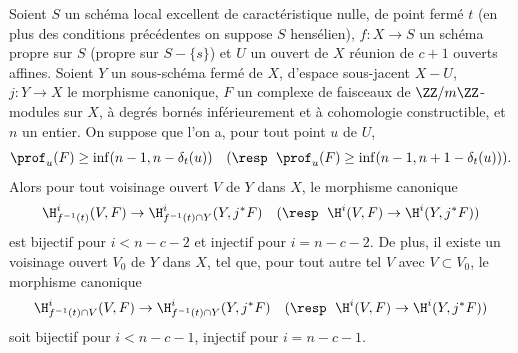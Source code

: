 \begin{proposition} \label{XIV.4.9}
Soient $S$ un sch\'ema local excellent de caract\'eristique nulle, de point ferm\'e $t$ (\resp en plus des conditions pr\'ec\'edentes on suppose $S$ hens\'elien), $f\colon X\to S$ un sch\'ema propre sur $S$ (\resp propre sur $S-\{ s\}$) et $U$ un ouvert de $X$ r\'eunion de $c+1$ ouverts affines. Soient $Y$ un sous-sch\'ema ferm\'e de $X$, d'espace sous-jacent $X-U$, $j\colon Y\to X$ le morphisme canonique, $F$ un complexe de faisceaux de $\ZZ/m\ZZ$-modules sur $X$, \`a degr\'es born\'es inf\'erieurement et \`a cohomologie constructible, et $n$ un entier. On suppose que l'on a, pour tout point $u$ de $U$,
$$
\prof_{u}(F)\geq\inf(n-1, n-\delta_{t}(u))\quad(\textrm{\resp }\;\prof_{u}(F)\geq\inf(n-1, n+1-\delta_{t}(u))).
$$
Alors pour tout voisinage ouvert $V$ de $Y$ dans $X$, le morphisme canonique\pageoriginale
$$
\H_{f^{-1}(t)}^{i}(V, F)\to\H_{f^{-1}(t)\cap Y}^{i}(Y, j^{\ast}F)\quad(\textrm{\resp }\;\H^{i}(V, F)\to\H^{i}(Y, j^{\ast}F))$$
est bijectif pour $i<n-c-2$ et injectif pour $i=n-c-2$. De plus, il existe un voisinage ouvert $V_{0}$ de $Y$ dans $X$, tel que, pour tout autre tel $V$ avec $V\subset V_{0}$, le morphisme canonique
$$
\H_{f^{-1}(t)\cap V}^{i}(V, F)\to\H_{f^{-1}(t)\cap Y}^{i}(Y, j^{\ast}F)\quad(\textrm{\resp }\;\H^{i}(V, F)\to\H^{i}(Y, j^{\ast}F))$$
soit bijectif pour $i<n-c-1$, injectif pour $i=n-c-1$.
\end{proposition}

